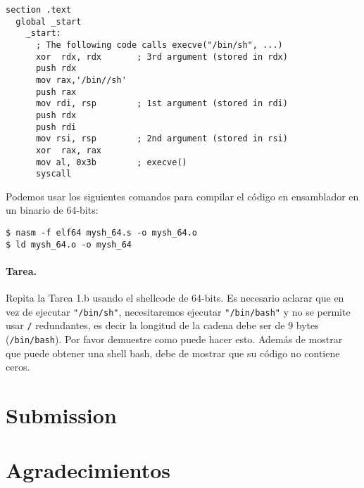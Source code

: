\begin{lstlisting}[caption={A 64-bit shellcode \texttt{mysh\_64.s}}]
  section .text
  global _start
    _start:
      ; The following code calls execve("/bin/sh", ...)
      xor  rdx, rdx       ; 3rd argument (stored in rdx)
      push rdx
      mov rax,'/bin//sh'  
      push rax
      mov rdi, rsp        ; 1st argument (stored in rdi)
      push rdx
      push rdi
      mov rsi, rsp        ; 2nd argument (stored in rsi)
      xor  rax, rax
      mov al, 0x3b        ; execve()
      syscall
\end{lstlisting}

Podemos usar los siguientes comandos para compilar el código en ensamblador en un binario de 64-bits:

\begin{lstlisting}
$ nasm -f elf64 mysh_64.s -o mysh_64.o
$ ld mysh_64.o -o mysh_64
\end{lstlisting}

\paragraph{Tarea.}
Repita la Tarea 1.b usando el shellcode de 64-bits. Es necesario aclarar que en vez de ejecutar \texttt{"/bin/sh"}, necesitaremos ejecutar \texttt{"/bin/bash"} y no se permite usar \texttt{/} redundantes, es decir la longitud de la cadena debe ser de 9 bytes (\texttt{/bin/bash}).
Por favor demuestre como puede hacer esto.
Además de mostrar que puede obtener una shell bash, debe de mostrar que su código no contiene ceros.

\section{Submission}



\section*{Agradecimientos}












